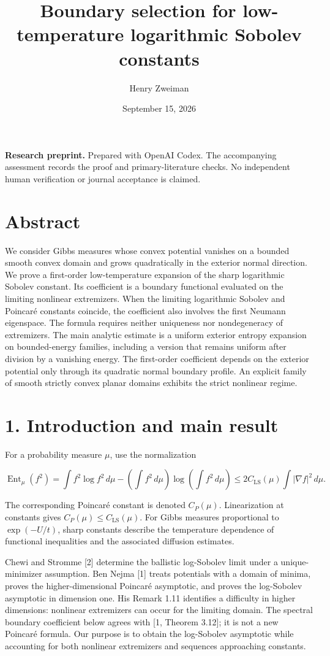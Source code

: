 \documentclass[11pt]{article}
\title{Boundary selection for low-temperature logarithmic Sobolev constants}
\author{Henry Zweiman}
\date{September 15, 2026}
\begin{document}
\maketitle
\textbf{Research preprint.} Prepared with OpenAI Codex. The accompanying
assessment records the proof and primary-literature checks. No
independent human verification or journal acceptance is claimed.

\section{Abstract}\label{abstract}

We consider Gibbs measures whose convex potential vanishes on a bounded
smooth convex domain and grows quadratically in the exterior normal
direction. We prove a first-order low-temperature expansion of the sharp
logarithmic Sobolev constant. Its coefficient is a boundary functional
evaluated on the limiting nonlinear extremizers. When the limiting
logarithmic Sobolev and Poincaré constants coincide, the coefficient
also involves the first Neumann eigenspace. The formula requires neither
uniqueness nor nondegeneracy of extremizers. The main analytic estimate
is a uniform exterior entropy expansion on bounded-energy families,
including a version that remains uniform after division by a vanishing
energy. The first-order coefficient depends on the exterior potential
only through its quadratic normal boundary profile. An explicit family
of smooth strictly convex planar domains exhibits the strict nonlinear
regime.

\section{1. Introduction and main
result}\label{introduction-and-main-result}

For a probability measure \(\mu\), use the normalization

\[\operatorname{Ent}_\mu(f^2)
=\int f^2\log f^2\,d\mu
-\left(\int f^2\,d\mu\right)\log\left(\int f^2\,d\mu\right)
\leq2C_{\mathrm{LS}}(\mu)\int|\nabla f|^2\,d\mu.\tag{1.1}\]

The corresponding Poincaré constant is denoted \(C_P(\mu )\).
Linearization at constants gives
\(C_P(\mu )\leq C_{\mathrm{LS}}(\mu )\). For Gibbs measures proportional
to \(\exp (-U/t)\), sharp constants describe the temperature dependence
of functional inequalities and the associated diffusion estimates.

Chewi and Stromme {[}2{]} determine the ballistic log-Sobolev limit
under a unique-minimizer assumption. Ben Nejma {[}1{]} treats potentials
with a domain of minima, proves the higher-dimensional Poincaré
asymptotic, and proves the log-Sobolev asymptotic in dimension one. His
Remark 1.11 identifies a difficulty in higher dimensions: nonlinear
extremizers can occur for the limiting domain. The spectral boundary
coefficient below agrees with {[}1, Theorem 3.12{]}; it is not a new
Poincaré formula. Our purpose is to obtain the log-Sobolev asymptotic
while accounting for both nonlinear extremizers and sequences
approaching constants.
\end{document}
